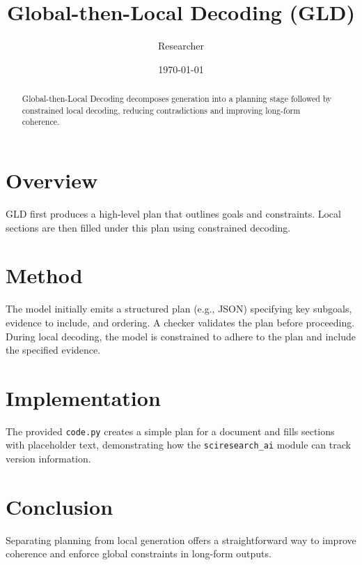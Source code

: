 \documentclass{article}
\title{Global-then-Local Decoding (GLD)}
\author{Researcher}
\date{\today}
\begin{document}
\maketitle

\begin{abstract}
Global-then-Local Decoding decomposes generation into a planning stage
followed by constrained local decoding, reducing contradictions and
improving long-form coherence.
\end{abstract}

\section{Overview}
GLD first produces a high-level plan that outlines goals and
constraints. Local sections are then filled under this plan using
constrained decoding.

\section{Method}
The model initially emits a structured plan (e.g., JSON) specifying key
subgoals, evidence to include, and ordering. A checker validates the
plan before proceeding. During local decoding, the model is constrained
to adhere to the plan and include the specified evidence.

\section{Implementation}
The provided \texttt{code.py} creates a simple plan for a document and
fills sections with placeholder text, demonstrating how the
\texttt{sciresearch\_ai} module can track version information.

\section{Conclusion}
Separating planning from local generation offers a straightforward way
to improve coherence and enforce global constraints in long-form
outputs.
\end{document}
